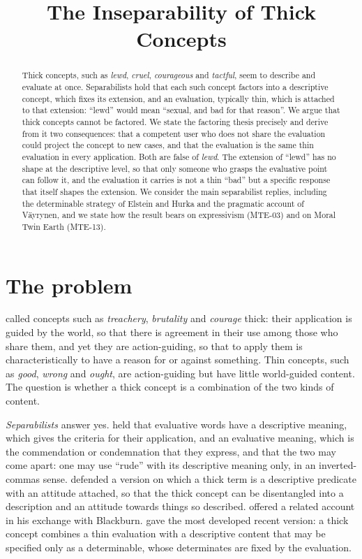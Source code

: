 \documentclass{situationist-preprint}
\title{The Inseparability of Thick Concepts}
\begin{document}
\maketitle

\begin{abstract}
Thick concepts, such as \emph{lewd}, \emph{cruel}, \emph{courageous} and \emph{tactful}, seem to describe and evaluate at once. Separabilists hold that each such concept factors into a descriptive concept, which fixes its extension, and an evaluation, typically thin, which is attached to that extension: \enquote{lewd} would mean \enquote{sexual, and bad for that reason}. We argue that thick concepts cannot be factored. We state the factoring thesis precisely and derive from it two consequences: that a competent user who does not share the evaluation could project the concept to new cases, and that the evaluation is the same thin evaluation in every application. Both are false of \emph{lewd}. The extension of \enquote{lewd} has no shape at the descriptive level, so that only someone who grasps the evaluative point can follow it, and the evaluation it carries is not a thin \enquote{bad} but a specific response that itself shapes the extension. We consider the main separabilist replies, including the determinable strategy of Elstein and Hurka and the pragmatic account of Väyrynen, and we state how the result bears on expressivism (MTE-03) and on Moral Twin Earth (MTE-13).
\end{abstract}

\section{The problem}

\citet{Williams1985} called concepts such as \emph{treachery}, \emph{brutality} and \emph{courage} thick: their application is guided by the world, so that there is agreement in their use among those who share them, and yet they are action-guiding, so that to apply them is characteristically to have a reason for or against something. Thin concepts, such as \emph{good}, \emph{wrong} and \emph{ought}, are action-guiding but have little world-guided content. The question is whether a thick concept is a combination of the two kinds of content.

\emph{Separabilists} answer yes. \citet{Hare1952,Hare1963} held that evaluative words have a descriptive meaning, which gives the criteria for their application, and an evaluative meaning, which is the commendation or condemnation that they express, and that the two may come apart: one may use \enquote{rude} with its descriptive meaning only, in an inverted-commas sense. \citet{Blackburn1992,Blackburn1998} defended a version on which a thick term is a descriptive predicate with an attitude attached, so that the thick concept can be disentangled into a description and an attitude towards things so described. \citet{Gibbard1992} offered a related account in his exchange with Blackburn. \citet{ElsteinHurka2009} gave the most developed recent version: a thick concept combines a thin evaluation with a descriptive content that may be specified only as a determinable, whose determinates are fixed by the evaluation.
\end{document}

